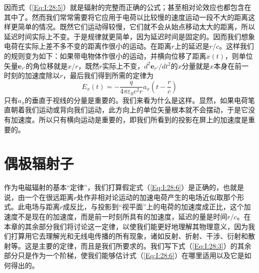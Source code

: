 因而式（\ref{Eq:I:28:5}）就是辐射的完整而正确的公式；甚至相对论效应也都包含在其中了。然而我们常常需要将它应用于电荷以比较慢的速度运动一段不大的距离这样更简单的情况。既然它们运动得较慢，它们就不会从始点移动太大的距离，所以延迟时间实际上不变。于是规律就更简单，因为延迟时间是固定的。因而我们想象电荷在实际上差不多不变的距离作很小的运动。在距离$r$上的延迟是$r/c$。这样我们的规则变为如下：如果带电物体作很小的运动，并横向位移了距离$x(t)$，则单位矢量$\boldsymbol{e}_{r'}$的角位移就是$x/r$，既然$r$实际上不变，$d^2\boldsymbol{e}_{r'}/dt^2$的$x$分量就是$x$本身在前一时刻的加速度除以$r$，最后我们得到所需的定律为
\begin{equation}
    \label{Eq:I:28:6}
    E_x(t) = -\frac{q}{4\pi\varepsilon_0c^2r} a_x\left ( t-\frac{r}{c} \right )
\end{equation}
只有$a_x$的垂直于视线的分量是重要的。我们来看为什么是这样。显然，如果电荷笔直朝着我们运动或背向我们运动，此方向上的单位矢量根本就不会摆动，于是它没有加速度。所以只有横向运动是重要的，即我们所看到的投影在屏上的加速度是重要的。

\section{偶极辐射子}

作为电磁辐射的基本“定律”，我们打算假定式（\ref{Eq:I:28:6}）是正确的，也就是说，由一个在很远距离$r$处作非相对论运动的加速电荷产生的电场近似取那个形式。此电场与距离$r$成反比，与投影到“视平面”上的电荷的加速度成正比，这个加速度不是现在的加速度，而是前一时刻所具有的加速度，延迟的量是时间$r/c$。在本章的其余部分我们将讨论这一定律，以使我们能更好地理解其物理意义，因为我们打算用它去理解光和无线电传播的所有现象，诸如反射、折射、干涉、衍射和散射等。这是主要的定律，而且是我们所要求的。我们写下式（\ref{Eq:I:28:3}）的其余部分只是作为一个阶梯，使我们能够估计式（\ref{Eq:I:28:6}）在哪里适用以及它是如何得出的。


